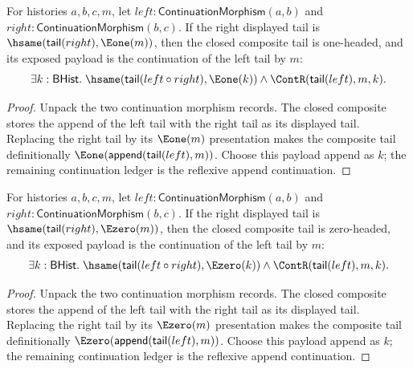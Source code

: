 \begin{theorem}
\label{thm:category-continuation-morphism-comp-right-visible-tail-result-cases}
For histories $a,b,c,m$, let
$left:\mathsf{ContinuationMorphism}(a,b)$ and
$right:\mathsf{ContinuationMorphism}(b,c)$. If the right displayed tail is
$\hsame(\mathsf{tail}(right),\Eone(m))$, then the closed composite tail is
one-headed, and its exposed payload is the continuation of the left tail by
$m$:
$$
\exists k:\mathsf{BHist}.\;
\hsame(\mathsf{tail}(left\circ right),\Eone(k))\land
\ContR(\mathsf{tail}(left),m,k).
$$
\end{theorem}
\begin{proof}
Unpack the two continuation morphism records. The closed composite stores the
append of the left tail with the right tail as its displayed tail. Replacing
the right tail by its $\Eone(m)$ presentation makes the composite tail
definitionally $\Eone(\mathsf{append}(\mathsf{tail}(left),m))$. Choose this
payload append as $k$; the remaining continuation ledger is the reflexive
append continuation.
\end{proof}

\begin{theorem}
\label{thm:category-continuation-morphism-comp-right-e0-tail-result-cases}
For histories $a,b,c,m$, let
$left:\mathsf{ContinuationMorphism}(a,b)$ and
$right:\mathsf{ContinuationMorphism}(b,c)$. If the right displayed tail is
$\hsame(\mathsf{tail}(right),\Ezero(m))$, then the closed composite tail is
zero-headed, and its exposed payload is the continuation of the left tail by
$m$:
$$
\exists k:\mathsf{BHist}.\;
\hsame(\mathsf{tail}(left\circ right),\Ezero(k))\land
\ContR(\mathsf{tail}(left),m,k).
$$
\end{theorem}
\begin{proof}
Unpack the two continuation morphism records. The closed composite stores the
append of the left tail with the right tail as its displayed tail. Replacing
the right tail by its $\Ezero(m)$ presentation makes the composite tail
definitionally $\Ezero(\mathsf{append}(\mathsf{tail}(left),m))$. Choose this
payload append as $k$; the remaining continuation ledger is the reflexive
append continuation.
\end{proof}


